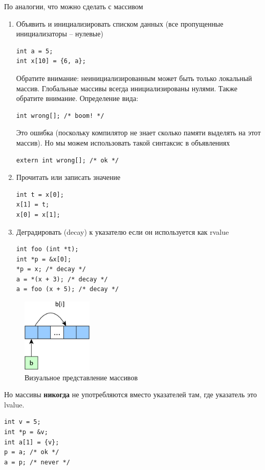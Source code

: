 \documentclass[a4paper,12pt,oneside]{article}
\begin{document}
По аналогии, что можно сделать с массивом

\begin{enumerate}
\item Объявить и инициализировать списком данных (все пропущенные инициализаторы -- нулевые)
\begin{lstlisting}
int a = 5;
int x[10] = {6, a};
\end{lstlisting}
Обратите внимание: неинициализированным может быть только локальный массив. Глобальные массивы всегда инициализированы нулями.
Также обратите внимание. Определение вида:
\begin{lstlisting}
int wrong[]; /* boom! */
\end{lstlisting}
Это ошибка (поскольку компилятор не знает сколько памяти выделять на этот массив). Но мы можем использовать такой синтаксис в объявлениях
\begin{lstlisting}
extern int wrong[]; /* ok */
\end{lstlisting}
\item Прочитать или записать значение
\begin{lstlisting}
int t = x[0];
x[1] = t;
x[0] = x[1];
\end{lstlisting}
\item Деградировать (decay) к указателю если он используется как rvalue\label{ArrDecaying}
\begin{lstlisting}
int foo (int *t);
int *p = &x[0];
*p = x; /* decay */
a = *(x + 3); /* decay */
a = foo (x + 5); /* decay */
\end{lstlisting}
\end{enumerate}

\begin{figure}[h!]
\centering
\includegraphics[width=0.3\textwidth]{illustrations/arrays-crop.pdf}
\caption{Визуальное представление массивов}
\label{fig:arrays-crop}
\end{figure}

Но массивы \textbf{никогда} не употребляются вместо указателей там, где указатель это lvalue.

\begin{lstlisting}
int v = 5;
int *p = &v;
int a[1] = {v};
p = a; /* ok */
a = p; /* never */
\end{lstlisting}
\end{document}
